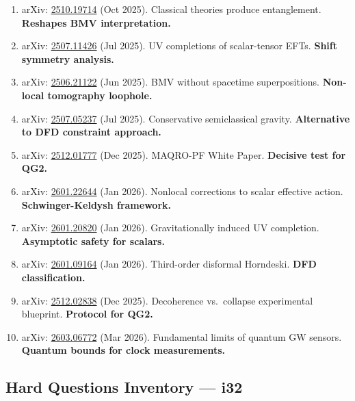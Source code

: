 \documentclass[11pt,a4paper]{article}
\begin{document}
\begin{enumerate}
\item arXiv: \href{https://arxiv.org/abs/2510.19714}{2510.19714} (Oct 2025). Classical theories produce entanglement. \textbf{Reshapes BMV interpretation.}
\item arXiv: \href{https://arxiv.org/abs/2507.11426}{2507.11426} (Jul 2025). UV completions of scalar-tensor EFTs. \textbf{Shift symmetry analysis.}
\item arXiv: \href{https://arxiv.org/abs/2506.21122}{2506.21122} (Jun 2025). BMV without spacetime superpositions. \textbf{Non-local tomography loophole.}
\item arXiv: \href{https://arxiv.org/abs/2507.05237}{2507.05237} (Jul 2025). Conservative semiclassical gravity. \textbf{Alternative to DFD constraint approach.}
\item arXiv: \href{https://arxiv.org/abs/2512.01777}{2512.01777} (Dec 2025). MAQRO-PF White Paper. \textbf{Decisive test for QG2.}
\item arXiv: \href{https://arxiv.org/abs/2601.22644}{2601.22644} (Jan 2026). Nonlocal corrections to scalar effective action. \textbf{Schwinger-Keldysh framework.}
\item arXiv: \href{https://arxiv.org/abs/2601.20820}{2601.20820} (Jan 2026). Gravitationally induced UV completion. \textbf{Asymptotic safety for scalars.}
\item arXiv: \href{https://arxiv.org/abs/2601.09164}{2601.09164} (Jan 2026). Third-order disformal Horndeski. \textbf{DFD classification.}
\item arXiv: \href{https://arxiv.org/abs/2512.02838}{2512.02838} (Dec 2025). Decoherence vs.\ collapse experimental blueprint. \textbf{Protocol for QG2.}
\item arXiv: \href{https://arxiv.org/abs/2603.06772}{2603.06772} (Mar 2026). Fundamental limits of quantum GW sensors. \textbf{Quantum bounds for clock measurements.}
\end{enumerate}

\subsection{Hard Questions Inventory --- i32}
\label{sec:hard-questions}
\end{document}
